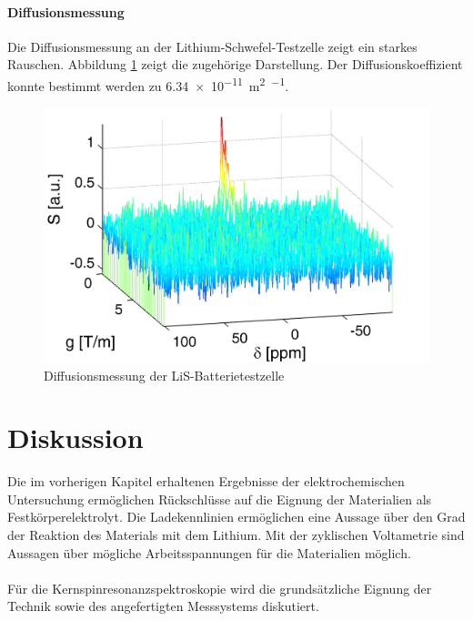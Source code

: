 \documentclass[a4paper, 11pt, headsepline,footsepline,twoside,abstract]{scrbook}
\begin{document}
\subsubsection{Diffusionsmessung}
Die Diffusionsmessung an der Lithium-Schwefel-Testzelle zeigt ein starkes Rauschen. Abbildung \ref{LiS_Diff} zeigt die zugehörige Darstellung. Der Diffusionskoeffizient konnte bestimmt werden zu \SI{6,34e-11}{\square\meter\per\sec}.
\begin{figure}
	\centering
	\includegraphics[width=0.95\columnwidth]{images/LiS_Diff_Batterie.jpg}
	\caption{Diffusionsmessung der LiS-Batterietestzelle}
	\label{LiS_Diff}
\end{figure} 

\chapter{Diskussion}
%
Die im vorherigen Kapitel erhaltenen Ergebnisse der elektrochemischen Untersuchung ermöglichen Rückschlüsse auf die Eignung der Materialien als Festkörperelektrolyt. Die Ladekennlinien ermöglichen eine Aussage über den Grad der Reaktion des Materials mit dem Lithium. Mit der zyklischen Voltametrie sind Aussagen über mögliche Arbeitsspannungen für die Materialien möglich.
\\\\
Für die Kernspinresonanzspektroskopie wird die grundsätzliche Eignung der Technik sowie des angefertigten Messsystems diskutiert. %
\end{document}
